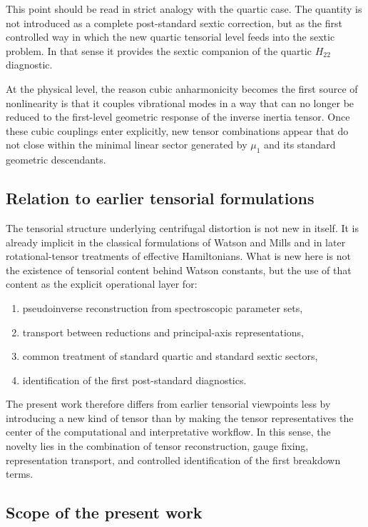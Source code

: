 \documentclass[aip,jcp,reprint,floatfix]{revtex4-2}
\begin{document}
This point should be read in strict analogy with the quartic case.
The quantity is not introduced as a complete post-standard sextic
correction, but as the first controlled way in which the new quartic
tensorial level feeds into the sextic problem. In that sense it
provides the sextic companion of the quartic $H_{22}$ diagnostic.

At the physical level, the reason cubic anharmonicity becomes the first
source of nonlinearity is that it couples vibrational modes in a way
that can no longer be reduced to the first-level geometric response of
the inverse inertia tensor. Once these cubic couplings enter
explicitly, new tensor combinations appear that do not close within the
minimal linear sector generated by $\mu_1$ and its standard geometric
descendants.

\subsection{Relation to earlier tensorial formulations}

The tensorial structure underlying centrifugal distortion is not new
in itself. It is already implicit in the classical formulations of
Watson and Mills and in later rotational-tensor treatments of
effective Hamiltonians.\cite{Watson1968,Watson1977,Mills1972,Kirschner1983}
What is new here is not the existence of
tensorial content behind Watson constants, but the use of that content
as the explicit operational layer for:
\begin{enumerate}
\item pseudoinverse reconstruction from spectroscopic parameter sets,
\item transport between reductions and principal-axis representations,
\item common treatment of standard quartic and standard sextic sectors,
\item identification of the first post-standard diagnostics.
\end{enumerate}

The present work therefore differs from earlier tensorial viewpoints
less by introducing a new kind of tensor than by making the tensor
representatives the center of the computational and interpretative
workflow. In this sense, the novelty lies in the combination of
tensor reconstruction, gauge fixing, representation transport, and
controlled identification of the first breakdown terms.

\subsection{Scope of the present work}
\end{document}
